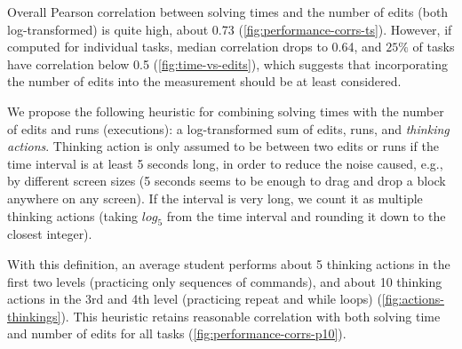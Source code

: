 Overall Pearson correlation between solving times and the number of edits (both
log-transformed) is quite high, about 0.73 (\cref{fig:performance-corrs-ts}).
However, if computed for individual tasks,
median correlation drops to 0.64, %
and $25\%$ of tasks have correlation below 0.5 %
(\cref{fig:time-vs-edits}), which suggests that incorporating the number of edits into the
measurement should be at least considered.

We propose the following heuristic for combining solving times with the number
of edits and runs (executions): a log-transformed sum of edits, runs, and \emph{thinking
actions}.
Thinking action is only assumed to be between two edits or runs if the time interval
is at least 5 seconds long, in order to reduce the noise caused, e.g., by
different screen sizes
(5 seconds seems to be enough to drag and drop a block anywhere on any screen).
If the interval is very long,
we count it as multiple thinking actions (taking $log_5$ from the time interval
and rounding it down to the closest integer).

With this definition, an average student performs about 5 thinking actions
in the first two levels (practicing only sequences of commands),
and about 10 thinking actions in the 3rd and 4th level (practicing repeat and while loops)
(\cref{fig:actions-thinkings}).
This heuristic retains reasonable correlation with both solving time
and number of edits for all tasks (\cref{fig:performance-corrs-p10}).



